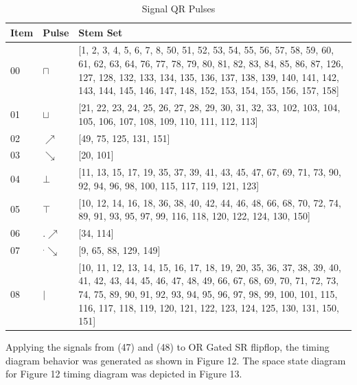 \documentclass[10pt,journal]{IEEEtran}
\begin{document}
\begin{table}[H] \caption{Signal QR Pulses}\centering\begin{tabular}{|p{.4cm}|p{.5cm}|p{6.5cm}|}\hline Item&Pulse &Stem Set\\ \hline 00& \footnotesize$\sqcap$ & \footnotesize[1, 2, 3, 4, 5, 6, 7, 8, 50, 51, 52, 53, 54, 55, 56, 57, 58, 59, 60, 61, 62, 63, 64, 76, 77, 78, 79, 80, 81, 82, 83, 84, 85, 86, 87, 126, 127, 128, 132, 133, 134, 135, 136, 137, 138, 139, 140, 141, 142, 143, 144, 145, 146, 147, 148, 152, 153, 154, 155, 156, 157, 158]\\ \hline 01& \footnotesize$\sqcup$ & \footnotesize[21, 22, 23, 24, 25, 26, 27, 28, 29, 30, 31, 32, 33, 102, 103, 104, 105, 106, 107, 108, 109, 110, 111, 112, 113]\\ \hline 02& \footnotesize$\nearrow$ & \footnotesize[49, 75, 125, 131, 151]\\ \hline 03& \footnotesize$\searrow$ & \footnotesize[20, 101]\\ \hline 04& \footnotesize$\bot$ & \footnotesize[11, 13, 15, 17, 19, 35, 37, 39, 41, 43, 45, 47, 67, 69, 71, 73, 90, 92, 94, 96, 98, 100, 115, 117, 119, 121, 123]\\ \hline 05& \footnotesize$\top$ & \footnotesize[10, 12, 14, 16, 18, 36, 38, 40, 42, 44, 46, 48, 66, 68, 70, 72, 74, 89, 91, 93, 95, 97, 99, 116, 118, 120, 122, 124, 130, 150]\\ \hline 06& \footnotesize$.\nearrow$ & \footnotesize[34, 114]\\ \hline 07& \footnotesize$^.\searrow$ & \footnotesize[9, 65, 88, 129, 149]\\ \hline 08& \footnotesize$|$ & \footnotesize[10, 11, 12, 13, 14, 15, 16, 17, 18, 19, 20, 35, 36, 37, 38, 39, 40, 41, 42, 43, 44, 45, 46, 47, 48, 49, 66, 67, 68, 69, 70, 71, 72, 73, 74, 75, 89, 90, 91, 92, 93, 94, 95, 96, 97, 98, 99, 100, 101, 115, 116, 117, 118, 119, 120, 121, 122, 123, 124, 125, 130, 131, 150, 151]\\ \hline \end{tabular} \end{table} 
Applying the signals from (47) and (48) to OR Gated    SR flipflop, the timing diagram behavior was generated as shown in Figure 12.    The space state diagram for Figure 12 timing diagram was depicted in Figure 13.
\end{document}
